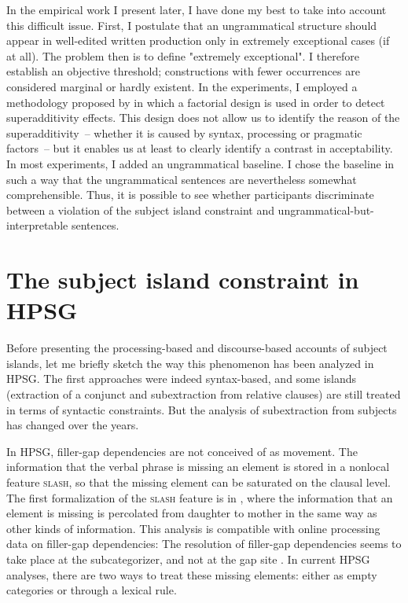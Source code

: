In the empirical work I present later, I have done my best to take into account this difficult issue. First, I postulate that an ungrammatical structure should appear in well-edited written production only in extremely exceptional cases (if at all). The problem then is to define "extremely exceptional". I therefore establish an objective threshold; constructions with fewer occurrences are considered marginal or hardly existent. In the experiments, I employed a methodology proposed by \citet{Sprouse.2007.PhD} in which a factorial design is used in order to detect superadditivity effects. This design does not allow us to identify the reason of the superadditivity~-- whether it is caused by syntax, processing or pragmatic factors~-- but it enables us at least to clearly identify a contrast in acceptability. In most experiments, I added an ungrammatical baseline. I chose the baseline in such a way that the ungrammatical sentences are nevertheless somewhat comprehensible. Thus, it is possible to see whether participants discriminate between a violation of the subject island constraint and ungrammatical-but-interpretable sentences. 


\section{The subject island constraint in HPSG}\largerpage

Before presenting the processing-based and discourse-based accounts of subject islands, let me briefly sketch the way this phenomenon has been analyzed in HPSG. The first approaches were indeed syntax-based, and some islands  (extraction of a conjunct and subextraction from relative clauses) are still treated in terms of syntactic constraints. But the analysis of subextraction from subjects has changed over the years.

In HPSG, filler-gap dependencies are not conceived of as movement. The information that the verbal phrase is missing an element is stored in a nonlocal feature \textsc{slash}, so that the missing element can be saturated on the clausal level. The first formalization of the \textsc{slash} feature is in \citet{Gazdar.1981}, where the information that an element is missing is percolated from daughter to mother in the same way as other kinds of information. This analysis is compatible with online processing data on filler-gap dependencies: The resolution of filler-gap dependencies seems to take place at the subcategorizer, and not at the gap site \citep{Boland.1995,Traxler.1996}.
In current HPSG analyses, there are two ways to treat these missing elements: either as empty categories or through a lexical rule.

